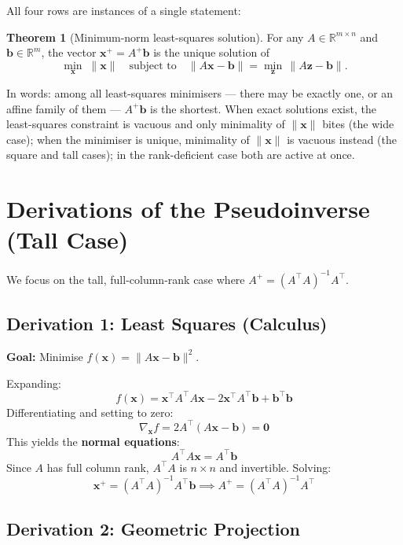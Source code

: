 \documentclass[12pt, a4paper]{article}
\theoremstyle{definition}
\newtheorem{theorem}{Theorem}
\begin{document}
All four rows are instances of a single statement:

\begin{theorem}[Minimum-norm least-squares solution]
For any $A \in \mathbb{R}^{m \times n}$ and $\mathbf{b} \in \mathbb{R}^m$, the vector $\mathbf{x}^+ = A^+\mathbf{b}$ is the unique solution of
\[
    \min_{\mathbf{x}}\; \|\mathbf{x}\| \quad \text{subject to} \quad \|A\mathbf{x} - \mathbf{b}\| = \min_{\mathbf{z}}\, \|A\mathbf{z} - \mathbf{b}\|.
\]
\end{theorem}

In words: among all least-squares minimisers — there may be exactly one, or an affine family of them — $A^+\mathbf{b}$ is the shortest. When exact solutions exist, the least-squares constraint is vacuous and only minimality of $\|\mathbf{x}\|$ bites (the wide case); when the minimiser is unique, minimality of $\|\mathbf{x}\|$ is vacuous instead (the square and tall cases); in the rank-deficient case both are active at once.

\section{Derivations of the Pseudoinverse (Tall Case)}

We focus on the tall, full-column-rank case where $A^+ = (A^\top A)^{-1}A^\top$.

\subsection{Derivation 1: Least Squares (Calculus)}

\textbf{Goal:} Minimise $f(\mathbf{x}) = \|A\mathbf{x} - \mathbf{b}\|^2$.

Expanding:
\[
    f(\mathbf{x}) = \mathbf{x}^\top A^\top A \mathbf{x} - 2\mathbf{x}^\top A^\top \mathbf{b} + \mathbf{b}^\top \mathbf{b}
\]
Differentiating and setting to zero:
\[
    \nabla_{\mathbf{x}} f = 2A^\top(A\mathbf{x} - \mathbf{b}) = \mathbf{0}
\]
This yields the \textbf{normal equations}:
\[
    A^\top A \mathbf{x} = A^\top \mathbf{b}
\]
Since $A$ has full column rank, $A^\top A$ is $n \times n$ and invertible. Solving:
\[
    \mathbf{x}^+ = (A^\top A)^{-1} A^\top \mathbf{b} \implies A^+ = (A^\top A)^{-1} A^\top
\]

\subsection{Derivation 2: Geometric Projection}
\end{document}
